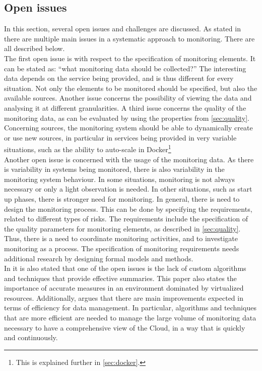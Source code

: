 \subsection{Open issues} \label{sec:open_issues}
In this section, several open issues and challenges are discussed. As stated in \cite{pernici2016monitoring, aceto2013cloud} there are multiple main issues in a systematic approach to monitoring. There are all described below.\\

\noindent
The first open issue is with respect to the specification of monitoring elements. It can be stated as: ``what monitoring data should be collected?'' The interesting data depends on the service being provided, and is thus different for every situation. Not only the elements to be monitored should be specified, but also the available sources. Another issue concerns the possibility of viewing the data and analysing it at different granularities. A third issue concerns the quality of the monitoring data, as can be evaluated by using the properties from \autoref{sec:quality}. Concerning sources, the monitoring system should be able to dynamically create or use new sources, in particular in services being provided in very variable situations, such as the ability to auto-scale in Docker\footnote{This is explained further in \autoref{sec:docker}.}\\

\noindent
Another open issue is concerned with the usage of the monitoring data. As there is variability in systems being monitored, there is also variability in the monitoring system behaviour. In some situations, monitoring is not always necessary or only a light observation is needed. In other situations, such as start up phases, there is stronger need for monitoring. In general, there is need to design the monitoring process. This can be done by specifying the requirements, related to different types of risks. The requirements include the specification of the quality parameters for monitoring elements, as described in \autoref{sec:quality}. Thus, there is a need to coordinate monitoring activities, and to investigate monitoring as a process. The specification of monitoring requirements needs additional research by designing formal models and methods.\\

\noindent
In \cite{aceto2013cloud} it is also stated that one of the open issues is the lack of custom algorithms and techniques that provide effective summaries. This paper also states the importance of accurate measures in an environment dominated by virtualized resources. Additionally, \cite{aceto2013cloud} argues that there are main improvements expected in terms of efficiency for data management. In particular, algorithms and techniques that are more efficient are needed to manage the large volume of monitoring data necessary to have a comprehensive view of the Cloud, in a way that is quickly and continuously.\\

